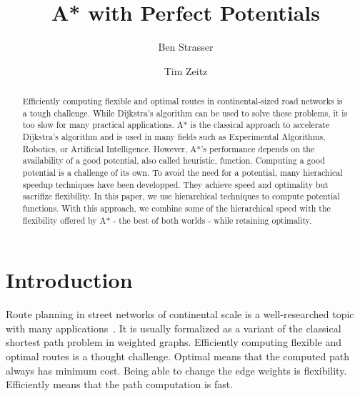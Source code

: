 \documentclass[a4paper,UKenglish,cleveref, autoref]{lipics-v2019}
\title{A* with Perfect Potentials} %
\author{Ben Strasser}{Germany}{academia@ben-strasser.net}{TODO}{}%
\author{Tim Zeitz}{Institute of Theoretical Informatics, Algorithmics I, Karlsruhe Institute of Technology, Germany}{tim.zeitz@kit.edu}{}{}
\begin{document}
\maketitle

\begin{abstract}
Efficiently computing flexible and optimal routes in continental-sized road networks is a tough challenge.
While Dijkstra's algorithm can be used to solve these problems, it is too slow for many practical applications.
A* is the classical approach to accelerate Dijkstra's algorithm and is used in many fields such as Experimental Algorithms, Robotics, or Artificial Intelligence.
However, A*'s performance depends on the availability of a good potential, also called heuristic, function.
Computing a good potential is a challenge of its own.
To avoid the need for a potential, many hierachical speedup techniques have been developped.
They achieve speed and optimality but sacrifize flexibility.
In this paper, we use hierarchical techniques to compute potential functions.
With this approach, we combine some of the hierarchical speed with the flexibility offered by A* - the best of both worlds - while retaining optimality.
\end{abstract}

\section{Introduction}
\label{sec:intro}
Route planning in street networks of continental scale is a well-researched topic with many applications~\cite{bdgmpsww-rptn-16}.
It is usually formalized as a variant of the classical shortest path problem in weighted graphs.
Efficiently computing flexible and optimal routes is a thought challenge.
Optimal means that the computed path always has minimum cost.
Being able to change the edge weights is flexibility.
Efficiently means that the path computation is fast.
\end{document}
